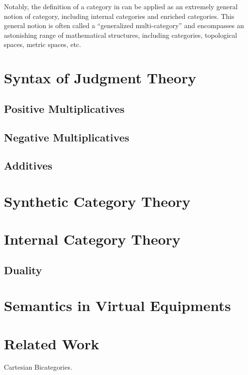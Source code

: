 \documentclass[a4paper,UKenglish,cleveref, autoref, thm-restate]{lipics-v2021}
\begin{document}
Notably, the definition of a category in  can be
applied as an extremely general notion of category, including internal
categories and enriched categories. This general notion is often
called a ``generalized multi-category'' and encompasses an astonishing
range of mathematical structures, including categories, topological
spaces, metric spaces, etc.

\section{Syntax of Judgment Theory}

\subsection{Positive Multiplicatives}

\subsection{Negative Multiplicatives}

\subsection{Additives}

\section{Synthetic Category Theory}

\section{Internal Category Theory}

\subsection{Duality}

\section{Semantics in Virtual Equipments}



\section{Related Work}

Cartesian Bicategories.
\end{document}
